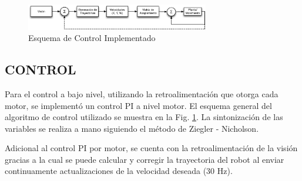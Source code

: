 \documentclass[twocolumn,10pt]{amrob}
\begin{document}

\begin{figure}
  \centering
    \includegraphics[width=8cm]{esquema_PID_motor.eps}
  \caption{Esquema de Control Implementado}
  \label{fig:ctrl}
\end{figure}
\subsection*{CONTROL}
Para el control a bajo nivel, utilizando la retroalimentación que otorga cada motor, se implementó un control PI a nivel motor. El esquema general del algoritmo de control utilizado se muestra en la Fig. \ref{fig:ctrl}. La sintonización de las variables se realiza a mano siguiendo el método de Ziegler - Nicholson. \par
Adicional al control PI por motor, se cuenta con la retroalimentación de la visión gracias a la cual se puede calcular y corregir la trayectoria del robot al enviar continuamente actualizaciones de la velocidad deseada (30 Hz). 
\end{document}
